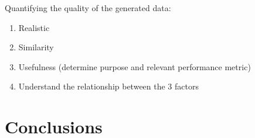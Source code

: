 \documentclass[parskip=full]{scrartcl}
\begin{document}

Quantifying the quality of the generated data:

\begin{enumerate}
    \item Realistic
    \item Similarity
    \item Usefulness (determine purpose and relevant performance metric)
    \item Understand the relationship between the 3 factors
\end{enumerate}

\section{Conclusions}~\label{sec:conclusions}

\printbibliography
\end{document}
